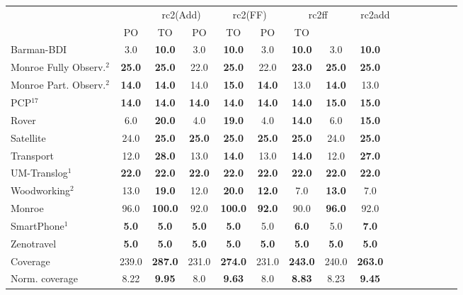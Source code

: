 \begin{tabular}{lccccccccccccccl} 
\toprule 
  && \multicolumn{2}{c}{rc2(Add)} & \multicolumn{2}{c}{rc2(FF)} & \multicolumn{2}{c}{rc2ff} & \multicolumn{2}{c}{rc2add} \\ 
\cmidrule(lr){3-4} \cmidrule(lr){5-6} \cmidrule(lr){7-8} \cmidrule(lr){9-10}  
 &PO & TO & PO & TO & PO & TO  \\ 
\midrule 
Barman-BDI & 3.0 & \textbf{10.0} & 3.0 & \textbf{10.0} & 3.0 & \textbf{10.0} & 3.0 & \textbf{10.0}  \\ 
Monroe Fully Observ.$^{2}$ & \textbf{25.0} & \textbf{25.0} & 22.0 & \textbf{25.0} & 22.0 & \textbf{23.0} & \textbf{25.0} & \textbf{25.0}  \\ 
Monroe Part. Observ.$^{2}$ & \textbf{14.0} & \textbf{14.0} & 14.0 & \textbf{15.0} & \textbf{14.0} & 13.0 & \textbf{14.0} & 13.0  \\ 
PCP$^{17}$ & \textbf{14.0} & \textbf{14.0} & \textbf{14.0} & \textbf{14.0} & \textbf{14.0} & \textbf{14.0} & \textbf{15.0} & \textbf{15.0}  \\ 
Rover & 6.0 & \textbf{20.0} & 4.0 & \textbf{19.0} & 4.0 & \textbf{14.0} & 6.0 & \textbf{15.0}  \\ 
Satellite & 24.0 & \textbf{25.0} & \textbf{25.0} & \textbf{25.0} & \textbf{25.0} & \textbf{25.0} & 24.0 & \textbf{25.0}  \\ 
Transport & 12.0 & \textbf{28.0} & 13.0 & \textbf{14.0} & 13.0 & \textbf{14.0} & 12.0 & \textbf{27.0}  \\ 
UM-Translog$^{1}$ & \textbf{22.0} & \textbf{22.0} & \textbf{22.0} & \textbf{22.0} & \textbf{22.0} & \textbf{22.0} & \textbf{22.0} & \textbf{22.0}  \\ 
Woodworking$^{2}$ & 13.0 & \textbf{19.0} & 12.0 & \textbf{20.0} & \textbf{12.0} & 7.0 & \textbf{13.0} & 7.0  \\ 
\midrule 
 Monroe & 96.0 & \textbf{100.0} & 92.0 & \textbf{100.0} & \textbf{92.0} & 90.0 & \textbf{96.0} & 92.0  \\ 
SmartPhone$^{1}$ & \textbf{5.0} & \textbf{5.0} & \textbf{5.0} & \textbf{5.0} & 5.0 & \textbf{6.0} & 5.0 & \textbf{7.0}  \\ 
Zenotravel & \textbf{5.0} & \textbf{5.0} & \textbf{5.0} & \textbf{5.0} & \textbf{5.0} & \textbf{5.0} & \textbf{5.0} & \textbf{5.0}  \\ 
\midrule 
 Coverage & 239.0 & \textbf{287.0} & 231.0 & \textbf{274.0} & 231.0 & \textbf{243.0} & 240.0 & \textbf{263.0}  \\ 
Norm. coverage & 8.22 & \textbf{9.95} & 8.0 & \textbf{9.63} & 8.0 & \textbf{8.83} & 8.23 & \textbf{9.45}  \\ 
\bottomrule 
 \end{tabular} 
